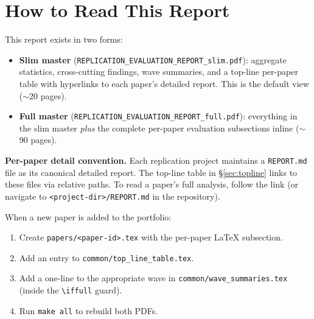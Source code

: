 \section{How to Read This Report}\label{sec:howtoread}

This report exists in two forms:

\begin{itemize}
  \item \textbf{Slim master} (\texttt{REPLICATION\_EVALUATION\_REPORT\_slim.pdf}):
    aggregate statistics, cross-cutting findings, wave summaries, and a
    top-line per-paper table with hyperlinks to each paper's detailed report.
    This is the default view ($\sim$20 pages).
  \item \textbf{Full master} (\texttt{REPLICATION\_EVALUATION\_REPORT\_full.pdf}):
    everything in the slim master \emph{plus} the complete per-paper evaluation
    subsections inline ($\sim$90 pages).
\end{itemize}

\noindent\textbf{Per-paper detail convention.} Each replication project
maintains a \texttt{REPORT.md} file as its canonical detailed report. The
top-line table in \S\ref{sec:topline} links to these files via relative paths.
To read a paper's full analysis, follow the link (or navigate to
\texttt{<project-dir>/REPORT.md} in the repository).

When a new paper is added to the portfolio:
\begin{enumerate}
  \item Create \texttt{papers/<paper-id>.tex} with the per-paper \LaTeX{} subsection.
  \item Add an entry to \texttt{common/top\_line\_table.tex}.
  \item Add a one-line \verb|| to the appropriate wave in
    \texttt{common/wave\_summaries.tex} (inside the
    \verb|\iffull| guard).
  \item Run \texttt{make all} to rebuild both PDFs.
\end{enumerate}
